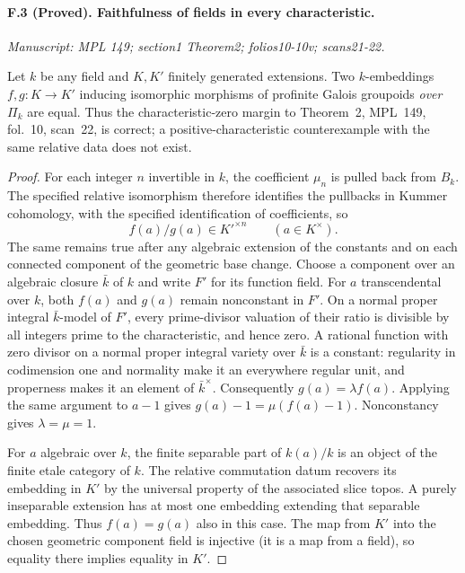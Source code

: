 \paragraph{F.3 (Proved). Faithfulness of fields in every characteristic.}
\textit{Manuscript: MPL 149; section1 Theorem2; folios10-10v; scans21-22.}

Let $k$ be any field and $K,K'$ finitely generated extensions. Two
$k$-embeddings $f,g:K\to K'$ inducing isomorphic morphisms of profinite
Galois groupoids \emph{over} $\Pi_k$ are equal. Thus the characteristic-zero
margin to Theorem~2, MPL~149, fol.~10, scan~22, is correct; a
positive-characteristic counterexample with the same relative data does
not exist.

\begin{proof}
For each integer $n$ invertible in $k$, the coefficient $\mu_n$ is pulled
back from $B_k$. The specified relative isomorphism therefore identifies
the pullbacks in Kummer cohomology, with the specified identification of
coefficients, so
\[
 f(a)/g(a)\in K'^{\times n}\qquad(a\in K^\times).
\]
The same remains true after any algebraic extension of the constants and
on each connected component of the geometric base change. Choose a
component over an algebraic closure $\bar k$ of $k$ and write $F'$ for its
function field. For $a$ transcendental over $k$, both $f(a)$ and $g(a)$
remain nonconstant in $F'$. On a normal proper integral $\bar k$-model of
$F'$, every prime-divisor valuation of their ratio is divisible by all
integers prime to the characteristic, and hence zero. A rational function
with zero divisor on a normal proper integral variety over $\bar k$ is a
constant: regularity in codimension one and normality make it an everywhere
regular unit, and properness makes it an element of $\bar k^\times$.
Consequently $g(a)=\lambda f(a)$. Applying the same argument to $a-1$
gives $g(a)-1=\mu(f(a)-1)$. Nonconstancy gives $\lambda=\mu=1$.

For $a$ algebraic over $k$, the finite separable part of $k(a)/k$ is an
object of the finite etale category of $k$. The relative commutation datum
recovers its embedding in $K'$ by the universal property of the associated
slice topos. A purely inseparable extension has at most one embedding
extending that separable embedding. Thus $f(a)=g(a)$ also in this case.
The map from $K'$ into the chosen geometric component field is injective
(it is a map from a field), so equality there implies equality in $K'$.
\end{proof}

